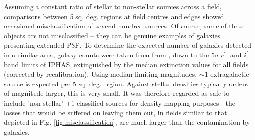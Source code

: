 \documentclass[a4paper,useAMS,usenatbib]{mn2e}
\begin{document}
Assuming a constant ratio of stellar to non-stellar sources across a field,
comparisons  between 5 sq. deg. regions at field centres and edges showed
occasional misclassification of  several hundred sources. Of course, some of these objects are not misclassified -- they can
be genuine examples of galaxies presenting extended PSF.  To determine the
expected number of galaxies detected in a similar area, galaxy counts were taken from from \citet{Yasuda2001}, down to the 
5$\sigma$ $r^{\prime}$- and $i^{\prime}$-band limits  of IPHAS, extinguished by the median \citet{Schlegel1998} extinction 
values for all fields (corrected by \citet{Schlafly2011} recalibration). Using median limiting magnitudes, $\sim 1$
extragalactic source is expected per 5 sq. deg. region. Against stellar densities typically orders of magnitude larger, this is
very small.  It was therefore regarded as safe to include 'non-stellar' +1 classified sources for density mapping 
purposes - the losses that would be  suffered on leaving them out, in fields similar to that depicted in 
Fig. \ref{fig:misclassification}, are much larger than  the contamination by galaxies.


\end{document}
